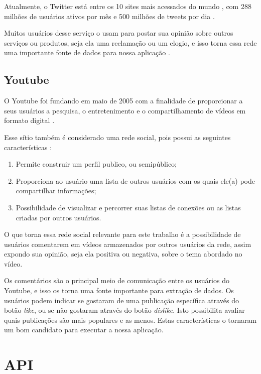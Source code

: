 Atualmente, o Twitter está entre os 10 sites mais acessados do mundo \cite{twitterOverview}, com 288 milhões de usuários ativos por mês e 500 milhões de tweets por dia \cite{aboutTwitter}.

Muitos usuários desse serviço o usam para postar sua opinião sobre outros serviços ou produtos, seja ela uma reclamação ou um elogio, e isso torna essa rede uma importante fonte de dados para nossa aplicação \cite{PAK10.385}.

    \subsection{Youtube}
    \label{subsec: Youtube}
O Youtube foi fundando em maio de 2005 com a finalidade de proporcionar a seus usuários a pesquisa, o entretenimento e o compartilhamento de vídeos em formato digital \cite{SobreYoutube}.

Esse sítio também é considerado uma rede social, pois possui as seguintes características \cite{Benevenuto}:
\begin{enumerate}
    \item Permite construir um perfil publico, ou semipúblico;
    \item Proporciona ao usuário uma lista de outros usuários com os quais ele(a) pode compartilhar informações;
    \item Possibilidade de visualizar e percorrer suas listas de conexões ou as listas criadas por outros usuários.
\end{enumerate} 

O que torna essa rede social relevante para este trabalho é a possibilidade de usuários comentarem em vídeos armazenados por outros usuários da rede, assim expondo sua opinião, seja ela positiva ou negativa, sobre o tema abordado no vídeo.

Os comentários são o principal meio de comunicação entre os usuários do Youtube, e isso os torna uma fonte importante para extração de dados.
Os usuários podem indicar se gostaram de uma publicação específica através do botão \textit{like}, ou se não gostaram através do botão \textit{dislike}. Isto possibilita avaliar quais publicações são mais populares e as menos. Estas características o tornaram um bom candidato para executar a nossa aplicação.

\section{API}
\label{sec: API}

